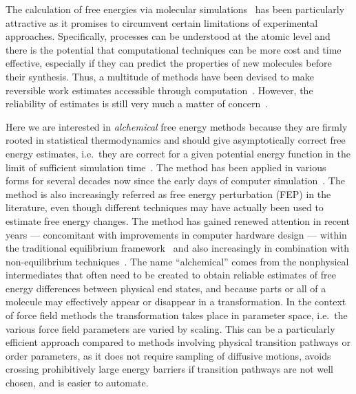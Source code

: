 \documentclass[journal=jctcce,manuscript=article]{achemso}
\begin{document}
The calculation of free energies via molecular
simulations~\cite{hansen_practical_2014, doi:10.1021/jp102971x,
  Gallicchio201127, doi:10.1080/08927022.2015.1132317,
  doi:10.1146/annurev.matsci.32.111901.153708} has been particularly
attractive as it promises to circumvent certain limitations of experimental
approaches. Specifically, processes can be understood at the atomic level and there is the potential that computational techniques can be
more cost and time effective, especially if they can predict the properties of new molecules before their synthesis.
Thus, a multitude of methods have been devised
 to make reversible work estimates accessible through
computation~\cite{hansen_practical_2014,
  doi:10.1021/jp102971x, Gallicchio201127,
  doi:10.1080/08927022.2015.1132317,
  doi:10.1146/annurev.matsci.32.111901.153708}.  However, the
reliability of estimates is still very much a matter of
concern~\cite{doi:10.1021/jp102971x, doi:10.1021/acs.jctc.5b00179}.

Here we are interested in \emph{alchemical} free energy methods because they
are firmly rooted in statistical thermodynamics and should give asymptotically
correct free energy estimates, i.e.\ they are correct for a given potential
energy function in the limit of sufficient simulation
time~\cite{Beveridge-citeulike:3789890, straatsma:92, doi:10.1021/cr00023a004,
hansen_practical_2014}.
The method has been applied in various forms for
several decades now since the early days of computer
simulation~\cite{doi:10.1063/1.1671118, bennett_efficient_1976,
doi:10.1063/1.432264, FS9821700055,  Tembe1984281, doi:10.1063/1.449208}.
The method is also increasingly referred as free energy perturbation (FEP)  in the literature, even though different techniques may have actually been used to estimate free energy changes.
The method has gained renewed attention in recent years --- concomitant with
improvements in computer hardware design --- within the traditional equilibrium
framework~\cite{GILSON19971047, doi:10.1021/jp0217839, deng_computations_2009}
and also increasingly in combination with non-equilibrium
techniques~\cite{ytreberg_comparison_2006, JCC:JCC23804,
  doi:10.1021/ct500964e}.  The name ``alchemical'' comes from the nonphysical
intermediates that often need to be created to obtain reliable estimates of
free energy differences between physical end states, and because parts or
all of a molecule may effectively appear or disappear in a transformation.  In the
context of force field methods the transformation takes place in parameter
space, i.e.\ the various force field parameters are varied by scaling.  This
can be a particularly efficient approach compared to methods involving physical transition pathways or order parameters, as it does not require sampling of
diffusive motions, avoids crossing prohibitively large energy barriers if
transition pathways are not well chosen, and is easier to automate.
\end{document}
